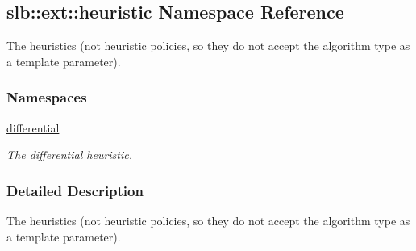 \hypertarget{namespaceslb_1_1ext_1_1heuristic}{}\subsection{slb\+:\+:ext\+:\+:heuristic Namespace Reference}
\label{namespaceslb_1_1ext_1_1heuristic}


The heuristics (not heuristic policies, so they do not accept the algorithm type as a template parameter).  


\subsubsection*{Namespaces}
\begin{DoxyCompactItemize}
\item 
 \hyperlink{namespaceslb_1_1ext_1_1heuristic_1_1differential}{differential}
\begin{DoxyCompactList}\small\item\em The differential heuristic. \end{DoxyCompactList}\end{DoxyCompactItemize}


\subsubsection{Detailed Description}
The heuristics (not heuristic policies, so they do not accept the algorithm type as a template parameter). 